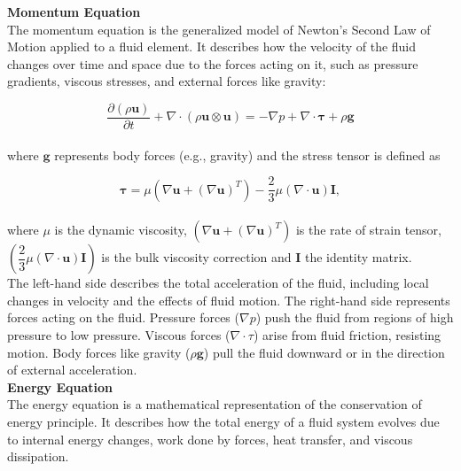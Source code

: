 \documentclass[a5paper]{sapthesis}
\begin{document}
	\noindent \textbf{Momentum Equation}\\
	The momentum equation is the generalized model of Newton's Second Law of Motion applied to a fluid element. It describes how the velocity of the fluid changes over time and space due to the forces acting on it, such as pressure gradients, viscous stresses, and external forces like gravity:
	
	\begin{equation}
		\dfrac{\partial (\rho \mathbf{u})}{\partial t} + \nabla \cdot (\rho \mathbf{u} \otimes \mathbf{u}) = -\nabla p + \nabla \cdot \boldsymbol{\tau} + \rho \mathbf{g}
		\label{momentum}
	\end{equation}
	\\
	where $\mathbf{g}$ represents body forces (e.g., gravity) and the stress tensor is defined as 
	
	\begin{equation}
		\boldsymbol{\tau} = \mu \left( \nabla \mathbf{u} + (\nabla \mathbf{u})^T \right) - \dfrac{2}{3} \mu (\nabla \cdot \mathbf{u}) \mathbf{I},
		\label{stress_tensor}
	\end{equation}	
	\\
	where $\mu$ is the dynamic viscosity, $\left( \nabla \mathbf{u} + (\nabla \mathbf{u})^T \right)$ is the rate of strain tensor, $\left(\dfrac{2}{3} \mu (\nabla \cdot \mathbf{u})\mathbf{I} \right)$ is the bulk viscosity correction and $\mathbf{I}$ the identity matrix.  \\
	The left-hand side describes the total acceleration of the fluid, including local changes in velocity and the effects of fluid motion. The right-hand side represents forces acting on the fluid. Pressure forces ($\nabla p$) push the fluid from regions of high pressure to low pressure. Viscous forces ($\nabla \cdot \tau$) arise from fluid friction, resisting motion.	Body forces like gravity ($\rho \mathbf{g}$) pull the fluid downward or in the direction of external acceleration.\\
	
	\noindent \textbf{Energy Equation}\\
	The energy equation is a mathematical representation of the conservation of energy principle. It describes how the total energy of a fluid system evolves due to internal energy changes, work done by forces, heat transfer, and viscous dissipation.
 
\end{document}
